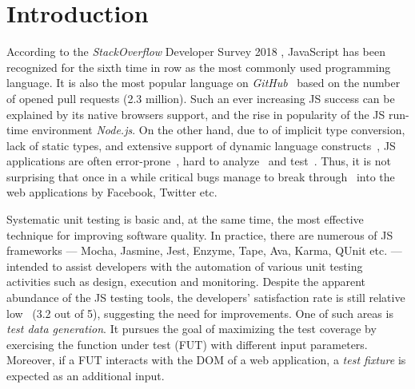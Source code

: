 \section{Introduction}
\label{sec.intro}

According to the \emph{StackOverflow} Developer Survey 2018 \cite{stackoverflow2018}, JavaScript has been recognized for the sixth time in row as the most commonly used programming language. It is also the most popular language on \emph{GitHub}~\cite{guthub2017} based on the number of opened pull requests (2.3 million). Such an ever increasing JS success can be explained by its native browsers support, and the rise in popularity of the JS run-time environment \emph{Node.js}. On the other hand, due to of implicit type conversion, lack of static types, and extensive support of dynamic language constructs~\cite{richards2010analysis}, JS applications are often error-prone~\cite{frolin:TSE16}, hard to analyze~\cite{andreasen2017survey, sun2017analysis} and test~\cite{mesbah2015advances}. Thus, it is not surprising that once in a while critical bugs manage to break through~\cite{bugstories2017} into the web applications by Facebook, Twitter etc.

Systematic unit testing is basic and, at the same time, the most effective technique for improving software quality. In practice, there are numerous of JS frameworks --- Mocha, Jasmine, Jest, Enzyme, Tape, Ava, Karma, QUnit etc. --- intended to assist developers with the automation of various unit testing activities such as design, execution and monitoring. Despite the apparent abundance of the JS testing tools, the developers' satisfaction rate is still relative low~\cite{stateJS2017} (3.2 out of 5), suggesting the need for improvements. One of such areas is \emph{test data generation}. It pursues the goal of maximizing the test coverage by exercising the function under test (FUT) with different input parameters. Moreover, if a FUT interacts with the DOM of a web application, a \emph{test fixture} is expected as an additional input.


